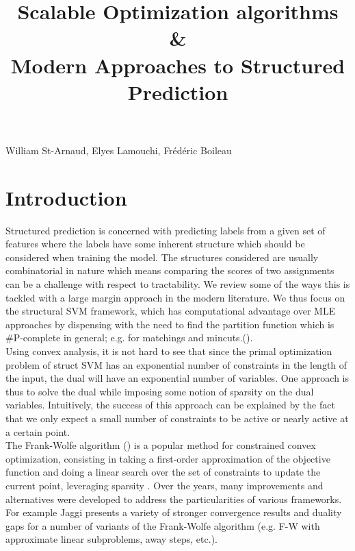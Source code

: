 \documentclass{article}
\title{Scalable Optimization algorithms\\ \& \\ Modern Approaches to Structured
Prediction}
\date{}
\begin{document}
 

\maketitle


\vspace{-0.5in}
\begin{center}
William St-Arnaud, Elyes Lamouchi, Fr\'ed\'eric Boileau
\end{center}
\vspace{0.2in}


\section*{Introduction}

Structured prediction is concerned with predicting labels from a given
set of features where the labels have some inherent structure which should
be considered when training the model. The structures considered are usually
combinatorial in nature which means comparing the scores of two assignments
can be a challenge with respect to tractability. We review some of the ways
this is tackled with a large margin approach in the modern literature.
We thus focus on the structural SVM framework, which has computational
advantage over MLE approaches by dispensing with the need to find the
partition function which is \#P-complete in general; e.g. for
matchings and mincuts.(\cite{dualextraSimon}).\\

Using convex analysis, it is not hard to see that since the primal optimization
problem of struct SVM has an exponential number of constraints in the length of
the input, the dual will have an exponential number of variables. One approach is
thus to solve the dual while imposing some notion of sparsity on the dual
variables. Intuitively, the success of this approach can be explained by the fact
that we only expect a small number of constraints to be active or nearly active
at a certain point. \\




The Frank-Wolfe algorithm (\cite{f-w}) is a popular method for constrained
convex optimization, consisting in taking a first-order approximation of the
objective function and doing a linear search over the set of constraints to
update the current point, leveraging sparsity . Over the years, many
improvements and alternatives were developed to address the particularities of
various frameworks. For example Jaggi \cite{Jaggi:229246} presents a variety of
stronger convergence results and duality gaps for a number of variants of the
Frank-Wolfe algorithm
(e.g. F-W with approximate linear subproblems, away steps, etc.).\\
\end{document}
